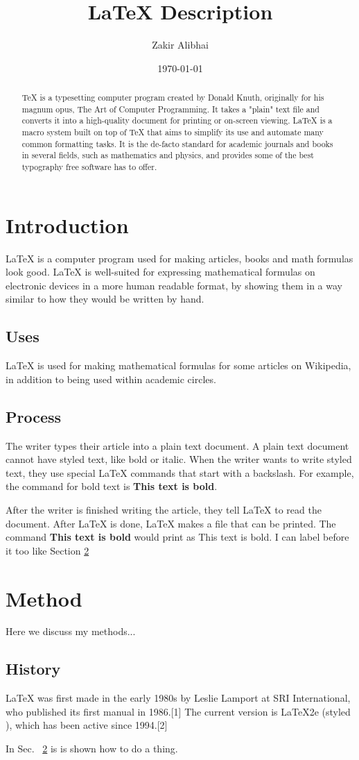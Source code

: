 \documentclass[letterpaper,notitlepage,11pt]{article}
\begin{document}
\title{LaTeX Description}
\author{Zakir Alibhai}
\date{\today}
\maketitle
\begin{abstract}
TeX is a typesetting computer program created by Donald Knuth, originally for his magnum opus, The Art of Computer Programming. It takes a "plain" text file and converts it into a high-quality document for printing or on-screen viewing. LaTeX is a macro system built on top of TeX that aims to simplify its use and automate many common formatting tasks. It is the de-facto standard for academic journals and books in several fields, such as mathematics and physics, and provides some of the best typography free software has to offer.
\end{abstract}
\section{Introduction}
\label{Intro}
LaTeX is a computer program used for making articles, books and math formulas look good. LaTeX is well-suited for expressing mathematical formulas on electronic devices in a more human readable format, by showing them in a way similar to how they would be written by hand.
\subsection{Uses}
LaTeX is used for making mathematical formulas for some articles on Wikipedia, in addition to being used within academic circles.
\subsection{Process}
The writer types their article into a plain text document. A plain text document cannot have styled text, like bold or italic. When the writer wants to write styled text, they use special LaTeX commands that start with a backslash. For example, the command for bold text is \textbf{This text is bold}.

After the writer is finished writing the article, they tell LaTeX to read the document. After LaTeX is done, LaTeX makes a file that can be printed. The command \textbf{This text is bold} would print as This text is bold.
I can label before it too like Section \ref{myMethods}


\section{Method}
\label{myMethods}
Here we discuss my methods...

\subsection{History}
LaTeX was first made in the early 1980s by Leslie Lamport at SRI International, who published its first manual in 1986.[1] The current version is LaTeX2e (styled \LaTeXe), which has been active since 1994.[2]

In Sec. ~\ref{myMethods} is is shown how to do a thing.
\end{document}
